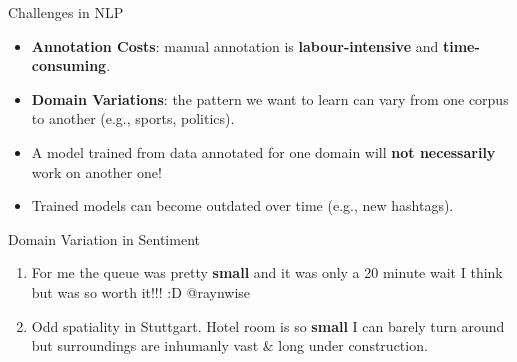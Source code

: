 \documentclass[handout]{beamer}
\begin{document}
\begin{frame}{Challenges in NLP}
\begin{scriptsize}
  \begin{itemize}
   \item \textbf{Annotation Costs}: manual annotation is \textbf{labour-intensive} and \textbf{time-consuming}. 
   \item \textbf{Domain Variations}: the pattern we want to learn can vary from one corpus to another (e.g., sports, politics).
 
 \item A model trained from data annotated for one domain will \textbf{not necessarily} work on another one! 
\item Trained models can become outdated over time (e.g., new hashtags).
  \end{itemize} 



\begin{block}{Domain Variation in Sentiment}
\begin{enumerate}
\item  For me the queue was pretty \textcolor[rgb]{0.00,0.00,1.00}{\textbf{small}} and it was only a 20 minute wait I think but was so worth it!!! :D @raynwise
\item Odd spatiality in Stuttgart. Hotel room is so  \textcolor[rgb]{1.00,0.00,0.00}{\textbf{small}} I can barely turn around but surroundings are inhumanly vast \& long under construction.
\end{enumerate}
\end{block}


\end{scriptsize}

\end{frame}
\end{document}
